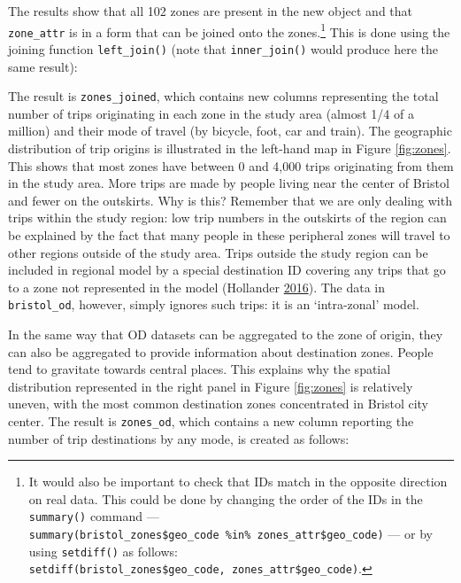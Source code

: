 \documentclass[]{krantz}
\newenvironment{Shaded}{\begin{snugshade}}{\end{snugshade}}
\newcommand{\CommentTok}[1]{\textcolor[rgb]{0.37,0.37,0.37}{\textit{#1}}}
\newcommand{\DataTypeTok}[1]{\textcolor[rgb]{0.27,0.27,0.27}{#1}}
\newcommand{\KeywordTok}[1]{\textcolor[rgb]{0.27,0.27,0.27}{\textbf{#1}}}
\newcommand{\NormalTok}[1]{#1}
\newcommand{\OperatorTok}[1]{\textcolor[rgb]{0.43,0.43,0.43}{\textbf{#1}}}
\newcommand{\StringTok}[1]{\textcolor[rgb]{0.5,0.5,0.5}{#1}}
\let\rmarkdownfootnote\footnote%
\def\footnote{\protect\rmarkdownfootnote}
\begin{document}
The results show that all 102 zones are present in the new object and that \texttt{zone\_attr} is in a form that can be joined onto the zones.\footnote{It would also be important to check that IDs match in the opposite direction on real data.
  This could be done by changing the order of the IDs in the \texttt{summary()} command --- \texttt{summary(bristol\_zones\$geo\_code\ \%in\%\ zones\_attr\$geo\_code)} --- or by using \texttt{setdiff()} as follows: \texttt{setdiff(bristol\_zones\$geo\_code,\ zones\_attr\$geo\_code)}.}
This is done using the joining function \texttt{left\_join()} (note that \texttt{inner\_join()} would produce here the same result):

\begin{Shaded}
\end{Shaded}

The result is \texttt{zones\_joined}, which contains new columns representing the total number of trips originating in each zone in the study area (almost 1/4 of a million) and their mode of travel (by bicycle, foot, car and train).
The geographic distribution of trip origins is illustrated in the left-hand map in Figure \ref{fig:zones}.
This shows that most zones have between 0 and 4,000 trips originating from them in the study area.
More trips are made by people living near the center of Bristol and fewer on the outskirts.
Why is this? Remember that we are only dealing with trips within the study region:
low trip numbers in the outskirts of the region can be explained by the fact that many people in these peripheral zones will travel to other regions outside of the study area.
Trips outside the study region can be included in regional model by a special destination ID covering any trips that go to a zone not represented in the model (Hollander \protect\hyperlink{ref-hollander_transport_2016}{2016}).
The data in \texttt{bristol\_od}, however, simply ignores such trips: it is an `intra-zonal' model.

In the same way that OD datasets can be aggregated to the zone of origin, they can also be aggregated to provide information about destination zones.
People tend to gravitate towards central places.
This explains why the spatial distribution represented in the right panel in Figure \ref{fig:zones} is relatively uneven, with the most common destination zones concentrated in Bristol city center.
The result is \texttt{zones\_od}, which contains a new column reporting the number of trip destinations by any mode, is created as follows:
\end{document}
